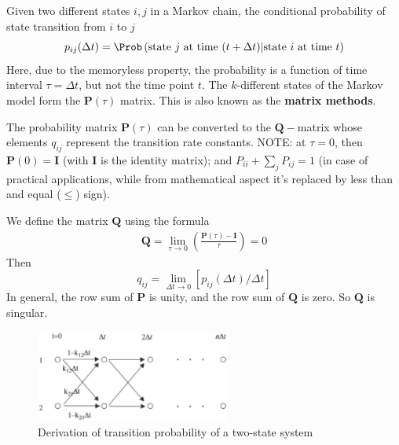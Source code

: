Given two different states $i,j$ in a Markov chain, the conditional probability
of state transition from $i$ to $j$
\begin{equation}
p_{ij}(\Delta t) = \Prob \left( \text{state $j$ at time } (t+\Delta t) |
\text{state $i$ at time }t \right)
\end{equation}
Here, due to the memoryless property, the probability is a function of time
interval $\tau=\Delta t$, but not the time point $t$. The $k$-different states
of the Markov model form the $\mathbf{P}(\tau)$ matrix. This is
also known as the {\bf matrix methods}.

The probability matrix $\mathbf{P}(\tau)$ can be converted to the
$\mathbf{Q}-$matrix whose elements $q_{ij}$ represent the transition rate
constants. NOTE: at $\tau=0$, then $\mathbf{P}(0)= \mathbf{I}$ (with
$\mathbf{I}$ is the identity matrix); and $P_{ii}+ \sum_{j}P_{ij} = 1$ (in case of practical
applications, while from mathematical aspect it's replaced by less than and equal ($\le$) sign).

We define the matrix $\mathbf{Q}$ using the formula
\begin{eqnarray}
  \label{eq:571}
  \mathbf{Q} =  \lim_{\tau\rightarrow 0}\left(\frac{\mathbf{P}(\tau)-\mathbf{I}}{\tau}\right) = 0
\end{eqnarray}
Then
\begin{equation}
q_{ij} = \lim_{\Delta t\rightarrow 0}\left[ p_{ij}(\Delta t)/\Delta t \right]
\end{equation}
In general, the row sum of $\mathbf{P}$ is unity, and the row sum of
$\mathbf{Q}$ is zero. So $\mathbf{Q}$ is singular.

\begin{figure}[hbt]
 \centerline{\includegraphics[height=3cm,
 angle=0]{./images/Qmatrix_state-transition.eps}}
\caption{Derivation of transition probability of a two-state system}
\label{fig:Qmatrix_state-transition}
\end{figure}

